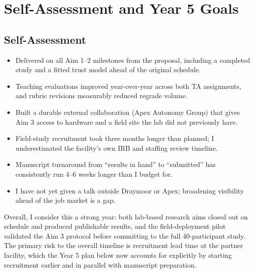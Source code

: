 \section{Self-Assessment and Year 5 Goals}
\label{sec:goals}

\subsection{Self-Assessment}

\noindent
\begin{minipage}[t]{0.48\textwidth}
\begin{infobox}[Strengths]
\begin{itemize}
  \item Delivered on all Aim 1--2 milestones from the proposal, including a completed study and
    a fitted trust model ahead of the original schedule.
  \item Teaching evaluations improved year-over-year across both TA assignments, and rubric
    revisions measurably reduced regrade volume.
  \item Built a durable external collaboration (Apex Autonomy Group) that gives Aim 3 access to
    hardware and a field site the lab did not previously have.
\end{itemize}
\end{infobox}
\end{minipage}
\hfill
\begin{minipage}[t]{0.48\textwidth}
\begin{infobox}
\begin{itemize}
  \item Field-study recruitment took three months longer than planned; I underestimated the
    facility's own IRB and staffing review timeline.
  \item Manuscript turnaround from ``results in hand'' to ``submitted'' has consistently run
    4--6 weeks longer than I budget for.
  \item I have not yet given a talk outside Draymoor or Apex; broadening visibility ahead of the
    job market is a gap.
\end{itemize}
\end{infobox}
\end{minipage}
\par
\vspace{10pt}

Overall, I consider this a strong year: both lab-based research aims closed out on schedule and
produced publishable results, and the field-deployment pilot validated the Aim 3 protocol
before committing to the full 40-participant study. The primary risk to the overall timeline is
recruitment lead time at the partner facility, which the Year 5 plan below now accounts for
explicitly by starting recruitment earlier and in parallel with manuscript preparation.

